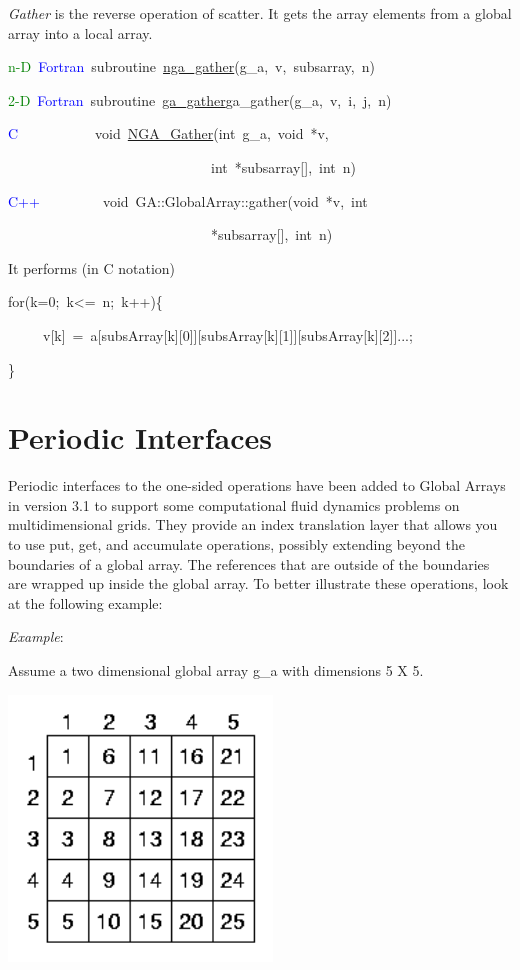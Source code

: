 \emph{Gather} is the reverse operation of scatter. It gets the array
elements from a global array into a local array.
\begin{lyxcode}
\textcolor{green}{n-D}~\textcolor{blue}{Fortran}~subroutine~\href{http://www.emsl.pnl.gov/docs/global/ga_ops.html\#ga_gather}{nga\_{}gather}(g\_a,~v,~subsarray,~n)~

\textcolor{green}{2-D}~\textcolor{blue}{Fortran}~subroutine~\href{http://www.emsl.pnl.gov/docs/global/ga_ops.html\#ga_gather}{ga\_{}gather}ga\_gather(g\_a,~v,~i,~j,~n)~

\textcolor{blue}{C}~~~~~~~~~~~void~\href{http://www.emsl.pnl.gov/docs/global/c_nga_ops.html\#ga_gather}{NGA\_{}Gather}(int~g\_a,~void~{*}v,~

~~~~~~~~~~~~~~~~~~~~~~~~~~~~~int~{*}subsarray{[}{]},~int~n)~

\textcolor{blue}{C++}~~~~~~~~~void~GA::GlobalArray::gather(void~{*}v,~int~

~~~~~~~~~~~~~~~~~~~~~~~~~~~~~{*}subsarray{[}{]},~int~n)
\end{lyxcode}
It performs (in C notation)
\begin{lyxcode}
for(k=0;~k<=~n;~k++)\{~

~~~~~v{[}k{]}~=~a{[}subsArray{[}k{]}{[}0{]}{]}{[}subsArray{[}k{]}{[}1{]}{]}{[}subsArray{[}k{]}{[}2{]}{]}...;~

\}~
\end{lyxcode}

\section{Periodic Interfaces }

Periodic interfaces to the one-sided operations have been added to
Global Arrays in version 3.1 to support some computational fluid dynamics
problems on multidimensional grids. They provide an index translation
layer that allows you to use put, get, and accumulate operations,
possibly extending beyond the boundaries of a global array. The references
that are outside of the boundaries are wrapped up inside the global
array. To better illustrate these operations, look at the following
example:

\emph{Example}: 

Assume a two dimensional global array g\_a with dimensions 5 X 5.

\includegraphics[width=7cm]{periodic1}


